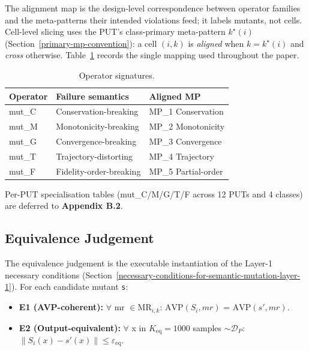 \documentclass[manuscript,screen,review]{acmart}
\begin{document}
The alignment map is the design-level correspondence between operator
families and the meta-patterns their intended violations feed; it labels
mutants, not cells. Cell-level slicing uses the PUT's class-primary
meta-pattern $k^\star(i)$ (Section~\ref{primary-mp-convention}): a cell
$(i,k)$ is \emph{aligned} when $k = k^\star(i)$ and \emph{cross}
otherwise.
Table~\ref{tab:p2-01} records the single mapping used throughout the
paper.

\begin{table}[t]
\caption{Operator signatures.}\label{tab:p2-01}
\centering
\begin{tabular}{@{}lll@{}}
\toprule
Operator & Failure semantics & Aligned MP \\
\midrule
mut\_C & Conservation-breaking & MP\_1 Conservation \\
mut\_M & Monotonicity-breaking & MP\_2 Monotonicity \\
mut\_G & Convergence-breaking & MP\_3 Convergence \\
mut\_T & Trajectory-distorting & MP\_4 Trajectory \\
mut\_F & Fidelity-order-breaking & MP\_5 Partial-order \\
\bottomrule
\end{tabular}
\end{table}

Per-PUT specialisation tables (mut\_C/M/G/T/F across 12 PUTs and 4
classes) are deferred to \textbf{Appendix B.2}.

\subsection{Equivalence Judgement}\label{equivalence-judgement-e1-e2-layer-2}

The equivalence judgement is the executable instantiation of the Layer-1
necessary conditions (Section~\ref{necessary-conditions-for-semantic-mutation-layer-1}). For each candidate mutant
\texttt{s\textquotesingle{}}:

\begin{itemize}

\item
  \textbf{E1 (AVP-coherent):} $\forall$ mr $\in \mathrm{MR}_{i,k}$: $\mathrm{AVP}(S_i, mr)$ =
  $\mathrm{AVP}(s', mr)$.
\item
  \textbf{E2 (Output-equivalent):} $\forall$ x in $K_{\mathrm{eq}}=1000$ samples
  $\sim \mathcal{D}_P$: $\|S_i(x) - s'(x)\| \leq \varepsilon_{\mathrm{eq}}$.
\end{itemize}
\end{document}

